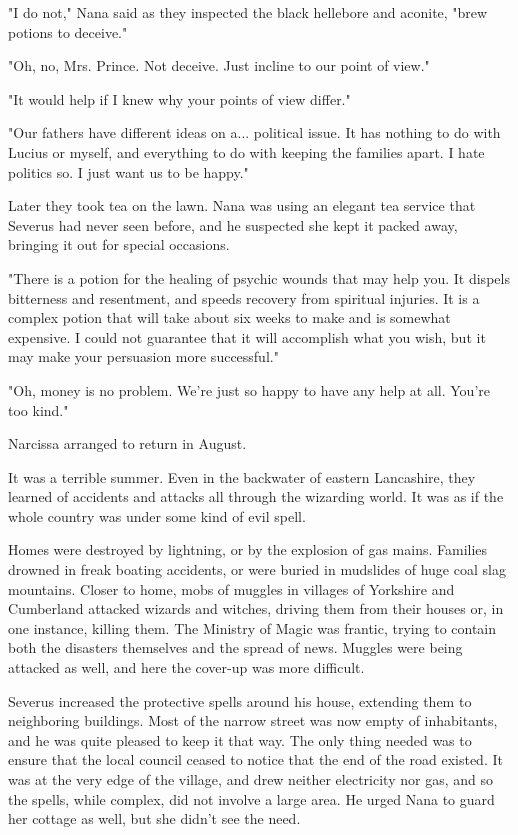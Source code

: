 \documentclass[a4paper,11pt]{article}
\begin{document}
"I do not," Nana said as they inspected the black hellebore and aconite, "brew potions to deceive."

"Oh, no, Mrs. Prince. Not deceive. Just incline to our point of view."

"It would help if I knew why your points of view differ."

"Our fathers have different ideas on a... political issue. It has nothing to do with Lucius or myself, and everything to do with keeping the families apart. I hate politics so. I just want us to be happy."

Later they took tea on the lawn. Nana was using an elegant tea service that Severus had never seen before, and he suspected she kept it packed away, bringing it out for special occasions.

"There is a potion for the healing of psychic wounds that may help you. It dispels bitterness and resentment, and speeds recovery from spiritual injuries. It is a complex potion that will take about six weeks to make and is somewhat expensive. I could not guarantee that it will accomplish what you wish, but it may make your persuasion more successful."

"Oh, money is no problem. We're just so happy to have any help at all. You're too kind."

Narcissa arranged to return in August.

It was a terrible summer. Even in the backwater of eastern Lancashire, they learned of accidents and attacks all through the wizarding world. It was as if the whole country was under some kind of evil spell.

Homes were destroyed by lightning, or by the explosion of gas mains. Families drowned in freak boating accidents, or were buried in mudslides of huge coal slag mountains. Closer to home, mobs of muggles in villages of Yorkshire and Cumberland attacked wizards and witches, driving them from their houses or, in one instance, killing them. The Ministry of Magic was frantic, trying to contain both the disasters themselves and the spread of news. Muggles were being attacked as well, and here the cover-up was more difficult.

Severus increased the protective spells around his house, extending them to neighboring buildings. Most of the narrow street was now empty of inhabitants, and he was quite pleased to keep it that way. The only thing needed was to ensure that the local council ceased to notice that the end of the road existed. It was at the very edge of the village, and drew neither electricity nor gas, and so the spells, while complex, did not involve a large area. He urged Nana to guard her cottage as well, but she didn't see the need.
\end{document}
